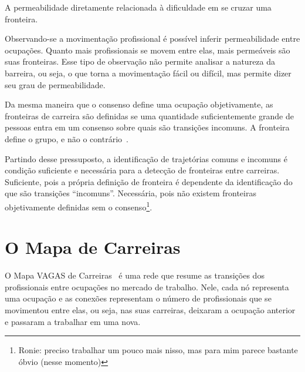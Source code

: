 \documentclass[
  article,
  11pt,
  a4paper,
  english,
  brazil,
  sumario=tradicional]{abntex2}
\begin{document}
A permeabilidade diretamente relacionada à dificuldade em se cruzar uma fronteira.

Observando-se a movimentação profissional é possível inferir permeabilidade entre ocupações. Quanto mais profissionais se movem entre elas, mais permeáveis são suas fronteiras. Esse tipo de observação não permite analisar a natureza da barreira, ou seja, o que torna a movimentação fácil ou difícil, mas permite dizer seu grau de permeabilidade.

Da mesma maneira que o consenso define uma ocupação objetivamente, as fronteiras de carreira são definidas se uma quantidade suficientemente grande de pessoas entra em um consenso sobre quais são transições incomuns. A fronteira define o grupo, e não o contrário~\cite{Gunz2007-hr}.

Partindo desse pressuposto, a identificação de trajetórias comuns e incomuns é condição suficiente e necessária para a detecção de fronteiras entre carreiras. Suficiente, pois a própria definição de fronteira é dependente da identificação do que são transições \enquote{incomuns}. Necessária, pois não existem fronteiras objetivamente definidas sem o consenso\footnote{Ronie: preciso trabalhar um pouco mais nisso, mas para mim parece bastante óbvio (nesse momento)}.

\section{O Mapa de Carreiras} \label{sec:mapa}

O Mapa VAGAS de Carreiras~\cite{VAGAS_Tecnologia2015-yv} é uma rede que resume as transições dos profissionais entre ocupações no mercado de trabalho. Nele, cada nó representa uma ocupação e as conexões representam o número de profissionais que se movimentou entre elas, ou seja, nas suas carreiras, deixaram a ocupação anterior e passaram a trabalhar em uma nova.
\end{document}
